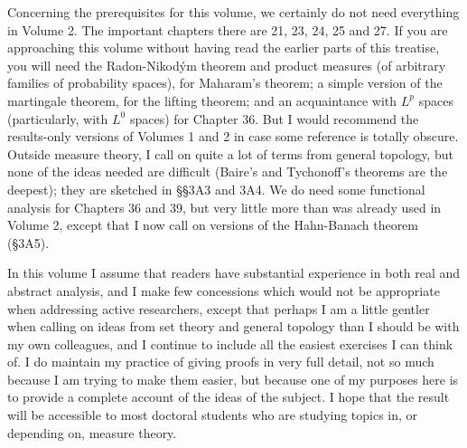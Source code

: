 Concerning the prerequisites for this volume, we certainly do not need
everything in Volume 2.   The important chapters there are 21, 23, 24,
25 and 27.   If you are approaching this volume without having read the
earlier parts of this treatise, you will need the Radon-Nikod\'ym
theorem and product measures (of arbitrary families of probability
spaces), for Maharam's theorem;  a simple version of the martingale
theorem, for the lifting theorem;  and an acquaintance with $L^p$ spaces
(particularly, with $L^0$ spaces) for Chapter 36.   But I would
recommend the results-only versions of Volumes 1 and 2 in case some
reference is totally obscure.   Outside measure theory, I call on quite
a lot of terms from general topology, but none of the ideas needed are
difficult (Baire's and Tychonoff's theorems are the deepest);  they are
sketched in
\S\S3A3 and 3A4.   We do need some functional analysis for Chapters 36
and 39, but very little more than was already used in Volume 2, except
that I now call on versions of the Hahn-Banach theorem (\S3A5).
     
In this volume I assume that readers have substantial experience in both
real and abstract analysis, and I make few concessions which would not
be appropriate when addressing active researchers, except that perhaps I
am a little gentler when calling on ideas from set theory and general
topology than I should be with my own colleagues, and I continue to
include all the easiest exercises I can think of.   I do maintain my
practice of giving proofs in very full detail, not so much because I am
trying to make them easier, but because one of my purposes here is to
provide a complete account of the ideas of the subject.   I hope that
the result will be accessible to most doctoral students who are studying
topics in, or depending on, measure theory.
     
\frnewpage

